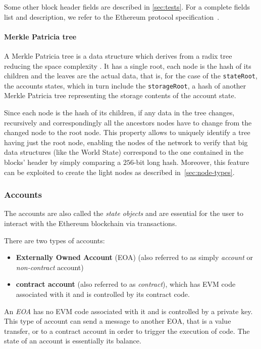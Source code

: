 Some other block header fields are described in \autoref{sec:tests}. For a
complete fields list and description, we refer to the Ethereum protocol
specification~\cite{wood2018ethereum}.

\paragraph{Merkle Patricia tree}
A Merkle Patricia tree is a data structure which derives from a radix tree
reducing the space complexity \cite{patriciatree}. It has a single root, each
node is the hash of its children and the leaves are the actual data, that is,
for the case of the \verb+stateRoot+, the accounts states, which in turn include
the \verb+storageRoot+, a hash of another Merkle Patricia tree representing the
storage contents of the account state.

Since each node is the hash of its children, if any data in the tree changes,
recursively and correspondingly all the ancestors nodes have to change from the
changed node to the root node. This property allows to uniquely identify a tree
having just the root node, enabling the nodes of the network to verify that big
data structures (like the World State) correspond to the one contained in the
blocks' header by simply comparing a $256$-bit long hash. Moreover, this feature
can be exploited to create the light nodes as described
in~\autoref{sec:node-types}.


\subsubsection{Accounts}
\label{sec:accounts}

The accounts are also called the \emph{state objects} and are essential for the
user to interact with the Ethereum blockchain via transactions.

There are two types of accounts:

\begin{itemize}
  \item \textbf{Externally Owned Account} (EOA) (also referred to as simply
  \emph{account} or \emph{non-contract} account)
  \item \textbf{contract account} (also referred to as \emph{contract}), which
  has EVM code associated with it and is controlled by its contract code.
\end{itemize}

An \emph{EOA} has no EVM code associated with it and is controlled by a private
key. This type of account can send a message to another EOA, that is a value
transfer, or to a contract account in order to trigger the execution of code.
The state of an account is essentially its balance.

